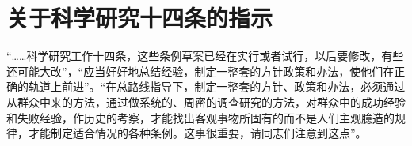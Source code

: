 \section[关于科学研究十四条的指示（一九六二年一月）]{关于科学研究十四条的指示}

“……科学研究工作十四条，这些条例草案已经在实行或者试行，以后要修改，有些还可能大改”，“应当好好地总结经验，制定一整套的方针政策和办法，使他们在正确的轨道上前进”。“在总路线指导下，制定一整套的方针、政策和办法，必须通过从群众中来的方法，通过做系统的、周密的调查研究的方法，对群众中的成功经验和失败经验，作历史的考察，才能找出客观事物所固有的而不是人们主观臆造的规律，才能制定适合情况的各种条例。这事很重要，请同志们注意到这点”。
